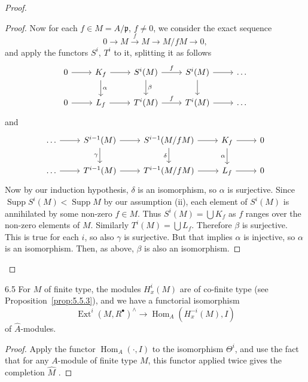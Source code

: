 \begin{proof}
\begin{proof}
Now for each $f\in M=A/\mathfrak{p}$, $f\neq0$, we consider the exact sequence
\[
0\longrightarrow M\xrightarrow{f} M\longrightarrow M/fM\longrightarrow 0,
\]
and apply the functors $S^{i}$, $T^{i}$ to it, splitting it as follows
\[
\begin{tikzcd}
	0 \arrow[r] & K_f \arrow[r] \arrow[d, "\alpha"] & S^i(M) \arrow[r, "f"] \arrow[d, "\beta"] & S^i(M) \arrow[r] \arrow[d] & \dots \\
	0 \arrow[r] & L_f \arrow[r] & T^i(M) \arrow[r, "f"] & T^i(M) \arrow[r] & \dots
\end{tikzcd}
\]
and
\[
\begin{tikzcd}
	\dots \arrow[r] & S^{i-1}(M) \arrow[r] \arrow[d, "\gamma"'] & S^{i-1}(M/fM) \arrow[r] \arrow[d, "\delta"'] & K_f \arrow[r] \arrow[d, "\alpha"'] & 0 \\
	\dots \arrow[r] & T^{i-1}(M) \arrow[r] & T^{i-1}(M/fM) \arrow[r] & L_f \arrow[r] & 0
\end{tikzcd}
\]
Now by our induction hypothesis, $\delta$ is an isomorphism, so $\alpha$ is surjective. Since $\operatorname{Supp}S^{i}(M)<\operatorname{Supp}M$ by our assumption (ii), each element of $S^{i}(M)$ is annihilated by some non-zero $f\in M$. Thus $S^{i}(M)=\bigcup K_f$ as $f$ ranges over the non-zero elements of $M$. Similarly $T^{i}(M)=\bigcup L_f$. Therefore $\beta$ is surjective. This is true for each $i$, so also $\gamma$ is surjective. But that implies $\alpha$ is injective, so $\alpha$ is an isomorphism. Then, as above, $\beta$ is also an isomorphism.
\end{proof}
\renewcommand{\qedsymbol}{}
\end{proof}

\begin{bookcorollary}{6.5}\label{cor:5.6.5}
For $M$ of finite type, the modules $H_x^{i}(M)$ are of co-finite type (see Proposition~\ref{prop:5.5.3}), and we have a functorial isomorphism
\[
\operatorname{Ext}^{i}(M,R^{\bullet})^{\wedge}\longrightarrow \operatorname{Hom}_A(H_{x}^{-i}(M), I)
\]
of $\widehat{A}$-modules.
\end{bookcorollary}

\begin{proof}
Apply the functor $\operatorname{Hom}_A(\cdot,I)$ to the isomorphism $\Theta^{i}$, and use the fact that for any $A$-module of finite type $M$, this functor applied twice gives the completion $\widehat{M}$ \cite[61]{LC}.
\end{proof}

